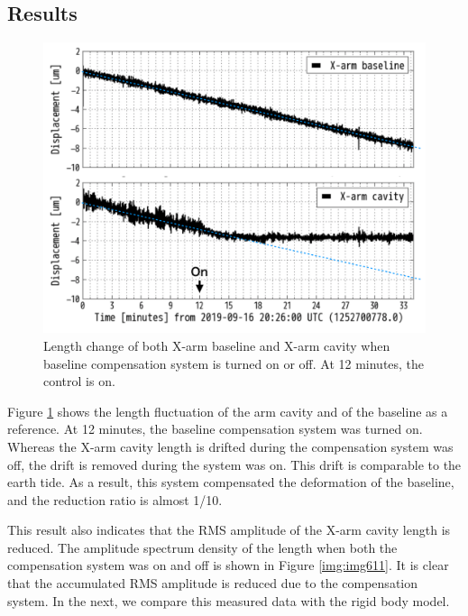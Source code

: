 \subsection{Results}
\begin{figure}[h]
  \centering
  \includegraphics[width=12cm]{./img_chap6/img610.png}
  \caption{Length change of both X-arm baseline and X-arm cavity when baseline compensation system is turned on or off. At 12 minutes, the control is on.}\label{img:img610}
\end{figure}

Figure \ref{img:img610} shows the length fluctuation of the arm cavity and of the baseline as a reference. At 12 minutes, the baseline compensation system was turned on. Whereas the X-arm cavity length is drifted during the compensation system was off, the drift is removed during the system was on. This drift is comparable to the earth tide. As a result, this system compensated the deformation of the baseline, and the reduction ratio is almost 1/10.

This result also indicates that the RMS amplitude of the X-arm cavity length is reduced. The amplitude spectrum density of the length when both the compensation system was on and off is shown in Figure \ref{img:img611}. It is clear that the accumulated RMS amplitude is reduced due to the compensation system. In the next, we compare this measured data with the rigid body model.

